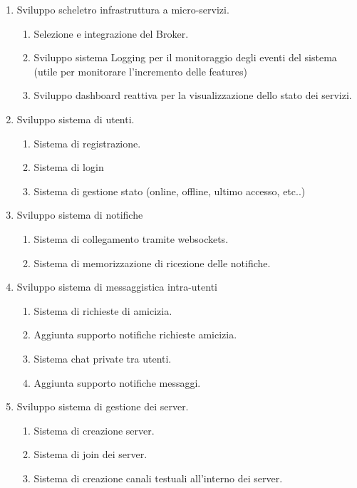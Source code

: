 \begin{enumerate}

    \item Sviluppo scheletro infrastruttura a micro-servizi.
    \begin{enumerate}
        \item Selezione e integrazione del Broker.
        \item Sviluppo sistema Logging per il monitoraggio degli eventi del sistema (utile per monitorare l'incremento delle features)
        \item Sviluppo dashboard reattiva per la visualizzazione dello stato dei servizi.
    \end{enumerate}
    
    \item Sviluppo sistema di utenti.
    \begin{enumerate}
        \item Sistema di registrazione.
        \item Sistema di login
        \item Sistema di gestione stato (online, offline, ultimo accesso, etc..)
    \end{enumerate}

    \item Sviluppo sistema di notifiche
    \begin{enumerate}
        \item Sistema di collegamento tramite websockets.
        \item Sistema di memorizzazione di ricezione delle notifiche.
    \end{enumerate}

    \item Sviluppo sistema di messaggistica intra-utenti
    \begin{enumerate}
        \item Sistema di richieste di amicizia.
        \item Aggiunta supporto notifiche richieste amicizia.
        \item Sistema chat private tra utenti.
        \item Aggiunta supporto notifiche messaggi.
    \end{enumerate}

    \item Sviluppo sistema di gestione dei server.
    \begin{enumerate}
        \item Sistema di creazione server.
        \item Sistema di join dei server.
        \item Sistema di creazione canali testuali all'interno dei server.
    \end{enumerate}


\end{enumerate}
